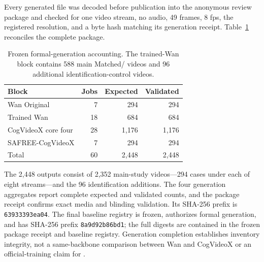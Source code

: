 Every generated file was decoded before publication into the anonymous review
package and checked for one video stream, no audio, 49 frames, 8 fps, the
registered resolution, and a byte hash matching its generation receipt.
Table~\ref{tab:generation-accounting} reconciles the complete package.

\begin{table}[H]
  \centering
  \caption{Frozen formal-generation accounting.  The trained-Wan block
  contains 588 main Matched/\methodshort{} videos and 96 additional
  identification-control videos.}
  \label{tab:generation-accounting}
  \small
  \begin{tabular}{@{}lrrr@{}}
    \toprule
    Block & Jobs & Expected & Validated \\
    \midrule
    Wan Original & 7 & 294 & 294 \\
    Trained Wan & 18 & 684 & 684 \\
    CogVideoX core four & 28 & 1,176 & 1,176 \\
    SAFREE-CogVideoX & 7 & 294 & 294 \\
    \midrule
    Total & 60 & 2,448 & 2,448 \\
    \bottomrule
  \end{tabular}
\end{table}

The 2,448 outputs consist of 2,352 main-study videos---294 cases under each
of eight streams---and the 96 identification additions.  The four generation
aggregates report complete expected and validated counts, and the package
receipt confirms exact media and blinding validation.  Its SHA-256 prefix is
\texttt{63933393ea04}.  The final baseline registry is frozen, authorizes
formal generation, and has SHA-256 prefix \texttt{8a9d92b86bd1}; the full
digests are contained in the frozen package receipt and baseline registry.
Generation completion establishes inventory integrity, not a same-backbone
comparison between Wan and CogVideoX or an official-training claim for
\tvtwounlearning.
